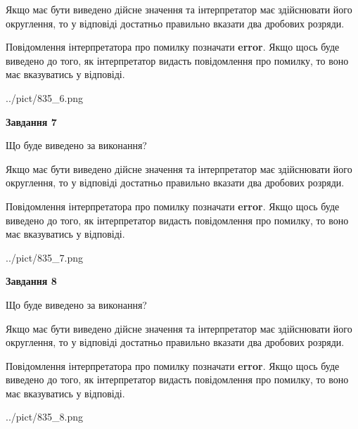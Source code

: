 \documentclass[12pt, ukrainian]{article}
\begin{document}
{\begin {Large}
Якщо має бути виведено дійсне значення та інтерпретатор має здійснювати його округлення, 
то у відповіді достатньо правильно вказати два дробових розряди.

Повідомлення інтерпретатора про помилку позначати \textbf{error}.
Якщо щось буде виведено до того, як інтерпретатор видасть повідомлення про помилку, 
то воно має вказуватись у відповіді. \par

\begin{center}
	{../pict/835_6.png}
\end{center}
\newpage

{\begin {center}\textbf{Завдання 7}\end {center}}\par
Що буде виведено за виконання? \par

Якщо має бути виведено дійсне значення та інтерпретатор має здійснювати його округлення, 
то у відповіді достатньо правильно вказати два дробових розряди.

Повідомлення інтерпретатора про помилку позначати \textbf{error}.
Якщо щось буде виведено до того, як інтерпретатор видасть повідомлення про помилку, 
то воно має вказуватись у відповіді. \par

\begin{center}
	{../pict/835_7.png}
\end{center}
\newpage

{\begin {center}\textbf{Завдання 8}\end {center}}\par
Що буде виведено за виконання? \par

Якщо має бути виведено дійсне значення та інтерпретатор має здійснювати його округлення, 
то у відповіді достатньо правильно вказати два дробових розряди.

Повідомлення інтерпретатора про помилку позначати \textbf{error}.
Якщо щось буде виведено до того, як інтерпретатор видасть повідомлення про помилку, 
то воно має вказуватись у відповіді. \par

\begin{center}
	{../pict/835_8.png}
\end{center}
\newpage


\end{Large}}
\end{document}
